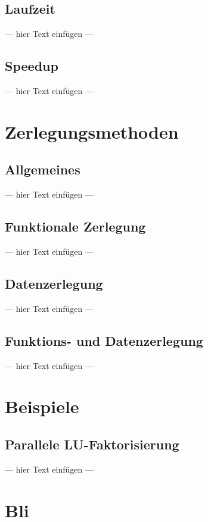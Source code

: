 \documentclass[a4paper, 12pt]{article}
\begin{document}
\subsection{Laufzeit}
--- hier Text einfügen ---


\subsection{Speedup}
--- hier Text einfügen ---



\section{Zerlegungsmethoden}


\subsection{Allgemeines}
--- hier Text einfügen ---


\subsection{Funktionale Zerlegung}
--- hier Text einfügen ---


\subsection{Datenzerlegung}
--- hier Text einfügen ---


\subsection{Funktions- und Datenzerlegung}
--- hier Text einfügen ---



\section{Beispiele}


\subsection{Parallele LU-Faktorisierung}
--- hier Text einfügen ---









\section{Bli}
\end{document}
